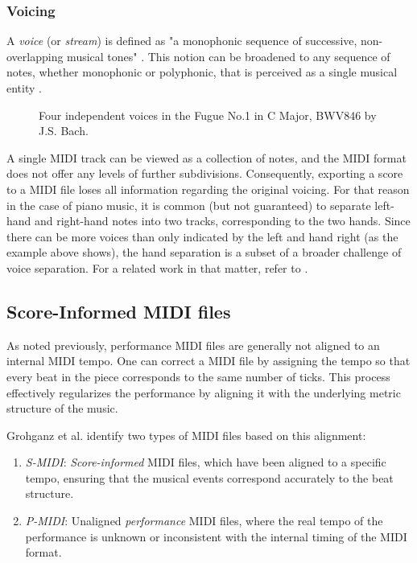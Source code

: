 \subsubsection{Voicing}

A \emph{voice} (or \emph{stream}) is defined as "a monophonic sequence of successive, non-overlapping musical tones" \cite{Karydis2007}. This notion can be broadened to any sequence of notes, whether monophonic or polyphonic, that is perceived as a single musical entity \cite{Cambouropoulos2008}.

\begin{figure}[ht!]
\centering

\caption[Four independent voices in the Fugue No.1 in C Major, BWV846 by J.S. Bach.]{Four independent voices in the Fugue No.1 in C Major, BWV846 by J.S. Bach.}
\end{figure}

A single MIDI track can be viewed as a collection of notes, and the MIDI format does not offer any levels of further subdivisions. Consequently, exporting a score to a MIDI file loses all information regarding the original voicing. For that reason in the case of piano music, it is common (but not guaranteed) to separate left-hand and right-hand notes into two tracks, corresponding to the two hands. Since there can be more voices than only indicated by the left and hand right (as the example above shows), the hand separation is a subset of a broader challenge of voice separation. For a related work in that matter, refer to \cite{Karydis2007}.
	
\subsection{Score-Informed MIDI files}\label{score-informed_midi_files}

As noted previously, performance MIDI files are generally not aligned to an internal MIDI tempo. One can correct a MIDI file by assigning the tempo so that every beat in the piece corresponds to the same number of ticks. This process effectively regularizes the performance by aligning it with the underlying metric structure of the music.

Grohganz et al. \cite{Grohganz2014} identify two types of MIDI files based on this alignment: \begin{enumerate}
	\item \emph{S-MIDI}: \emph{Score-informed} MIDI files, which have been aligned to a specific tempo, ensuring that the musical events correspond accurately to the beat structure.
	\item \emph{P-MIDI}: Unaligned \emph{performance} MIDI files, where the real tempo of the performance is unknown or inconsistent with the internal timing of the MIDI format. \end{enumerate}

